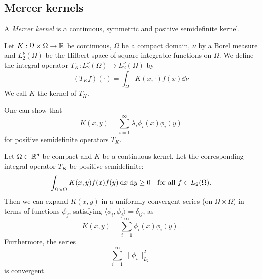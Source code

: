\documentclass[../lecture-notes.tex]{subfiles}
\begin{document}
\subsection*{Mercer kernels}
\begin{definition} %
\label{thm:35}
A \emph{Mercer kernel} is a continuous, symmetric and positive semidefinite kernel.
\end{definition}
\begin{definition} %
\label{thm:36}
Let $K : \Omega \times \Omega \to \mathbb{R}$ be continuous, $\Omega$ be a compact domain, $\nu$ by a Borel measure and $L_2^\nu(\Omega)$ be the Hilbert space of square integrable functions on $\Omega$.
We define the integral operator $T_K : L_2^\nu(\Omega) \to L_2^\nu(\Omega)$ by
\[
	\left( T_K f \right) (\cdot) = \int_\Omega K(x, \cdot) f(x) \dd \nu
\]
We call $K$ the kernel of $T_K$.
\end{definition}
One can show that
\[
	K(x, y) = \sum_{i=1}^\infty \lambda_i \phi_i(x) \phi_i(y)
\]
for positive semidefinite operators $T_K$.
\begin{theorem} %
\label{thm:37}
Let $\Omega \subset \mathbb{R}^d$ be compact and $K$ be a continuous kernel.
Let the corresponding integral operator $T_K$ be positive semidefinite:
\[
	\int_{\Omega \times \Omega} K(x, y) f(x) f(y) \:\mathrm{d} x \:\mathrm{d} y \geq 0 \quad \text{for all } f \in L_2(\Omega).
\]
Then we can expand $K(x, y)$ in a uniformly convergent series (on $\Omega \times \Omega$) in terms of functions $\phi_j$, satisfying $\langle \phi_i, \phi_j \rangle = \delta_{ij}$, as
\[
	K(x, y) = \sum_{i=1}^\infty \phi_i(x) \phi_i(y).
\]
Furthermore, the series
\[
	\sum_{i=1}^\infty \| \phi_i \|_{L_2}^2
\]
is convergent.
\end{theorem}
\end{document}

